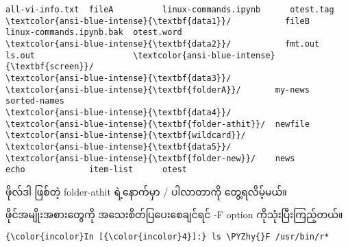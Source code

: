 \documentclass[11pt]{article}
\def\PYZhy{\char`\-}
\begin{document}
    \begin{Verbatim}[commandchars=\\\{\}]
all-vi-info.txt  fileA          linux-commands.ipynb      otest.tag
\textcolor{ansi-blue-intense}{\textbf{data1}}/           fileB          linux-commands.ipynb.bak  otest.word
\textcolor{ansi-blue-intense}{\textbf{data2}}/           fmt.out        ls.out                    \textcolor{ansi-blue-intense}{\textbf{screen}}/
\textcolor{ansi-blue-intense}{\textbf{data3}}/           \textcolor{ansi-blue-intense}{\textbf{folderA}}/       my-news                   sorted-names
\textcolor{ansi-blue-intense}{\textbf{data4}}/           \textcolor{ansi-blue-intense}{\textbf{folder-athit}}/  newfile                   \textcolor{ansi-blue-intense}{\textbf{wildcard}}/
\textcolor{ansi-blue-intense}{\textbf{data5}}/           \textcolor{ansi-blue-intense}{\textbf{folder-new}}/    news
echo             item-list      otest

    \end{Verbatim}

    ဖိုလ်ဒါ ဖြစ်တဲ့ folder-athit ရဲ့နောက်မှာ / ပါလာတာကို တွေ့ရလိမ့်မယ်။

ဖိုင်အမျိုးအစားတွေကို အသေးစိတ်ပြပေးစေချင်ရင် -F option
ကိုသုံးပြီးကြည့်တယ်။

    \begin{Verbatim}[commandchars=\\\{\}]
{\color{incolor}In [{\color{incolor}4}]:} ls \PYZhy{}F /usr/bin/r*
\end{Verbatim}
\end{document}
